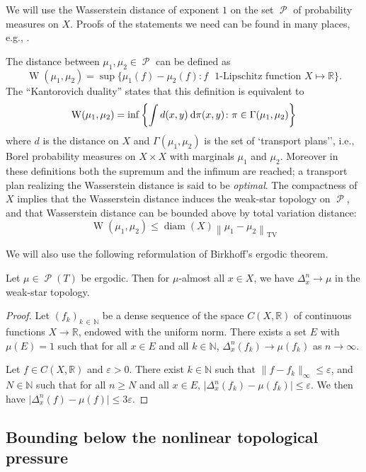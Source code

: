 \documentclass[AHL, Unicode, longabstracts,published]{cedram}
\theoremstyle{plain}
\theoremstyle{plain}
\newcommand\eps{\varepsilon}
\newcommand{\TV}{\mathrm{TV}}
\newcommand{\wass}{\operatorname{W}}
\newcommand{\diam}{\operatorname{diam}}
\newcommand\Prob{{\operatorname{\mathscr{P}}}}
\newcommand*{\dd} {\relax\ifnum\lastnodetype>0\mskip\medmuskip\fi\mathrm{d}}
\newcommand*\8{\infty}
\newcommand\NN{\mathbb{N}}
\newcommand\RR{\mathbb{R}}
\begin{document}
We will use the Wasserstein distance of exponent $1$ on the set $\Prob$ of probability measures on $X$. Proofs of the statements we need can be found in many places, e.g., \cite{Villani-book}.

The distance between $\mu_1,\mu_2\in\Prob$ can be defined as
\[
\wass(\mu_1,\mu_2) = \sup \big\{\mu_1(f)-\mu_2(f) \colon f \text{ $1$-Lipschitz function } X\mapsto \RR \big\}.
\]
The ``Kantorovich duality'' states that this definition is equivalent to
\[
\wass(\mu_1,\mu_2) = \inf \left\{\int d(x,y) \dd \pi(x,y) \colon \pi\in\Gamma(\mu_1,\mu_2) \right\}
\]
where $d$ is the distance on $X$ and $\Gamma(\mu_1,\mu_2)$ is the set of `transport plans'', i.e., Borel probability measures on $X\times X$ with marginals $\mu_1$ and $\mu_2$. Moreover in these definitions both the supremum and the infimum are reached; a transport plan realizing the Wasserstein distance is said to be \emph{optimal}. The compactness of $X$ implies that the Wasserstein distance induces the weak-star topology on $\Prob$, and that Wasserstein distance can be bounded above by total variation distance:
\[
\wass(\mu_1,\mu_2) \le \diam(X) \left\lVert \mu_1-\mu_2\right\rVert_{\TV}
\]

We will also use the following reformulation of Birkhoff's ergodic theorem.

\begin{lemm}\label{l:Birkhoff}
Let $\mu\in\Prob(T)$ be ergodic. Then for $\mu$-almost all $x\in X$, we have $\Delta_x^n \to \mu$ in the weak-star topology.
\end{lemm}

\begin{proof}
Let $(f_k)_{k\,\in\,\NN}$ be a dense sequence of the space $C(X,\RR)$ of continuous functions $X\to\RR$, endowed with the uniform norm. There exists a set $E$ {with $\mu(E)=1$} such that for all $x\in E$ and all $k\in\NN$, $\Delta_x^n(f_k) \to \mu(f_k)$ as $n\to\infty$.

Let $f\in C(X,\RR)$ and $\eps>0$. There exist $k\in\NN$ such that $\lVert f-f_k\rVert_\infty \le \eps$, and $N\in\NN$ such that for all $n\ge N$ and all $x\in E$, $\lvert \Delta_x^n(f_k)-\mu(f_k)\rvert\le\eps$. We then have $\lvert \Delta_x^n(f)-\mu(f)\rvert \le 3\eps$.
\end{proof}


\subsection{Bounding below the nonlinear topological pressure}
\end{document}
